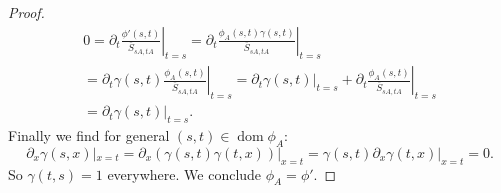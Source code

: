 \documentclass[b5paper,draft,openbib,12pt]{memoir}
\DeclareMathOperator{\dom}{dom}
\begin{document}
\begin{proof}
\begin{align}
0=\partial_t \left.\frac{\phi'(s,t)}{\overline{S}_{sA,tA}}\right|_{t=s}
=\partial_t \left.\frac{\phi_A(s,t) \gamma(s,t)}{\overline{S}_{sA,tA}}\right|_{t=s}\\
=\partial_t \left.\gamma(s,t) \frac{\phi_A(s,t)}{\overline{S}_{sA,tA}}\right|_{t=s}
=\partial_t \left.\gamma(s,t)\right|_{t=s} + \partial_t  \left.\frac{\phi_A(s,t)}{\overline{S}_{sA,tA}}\right|_{t=s}\\
=\partial_t \left.\gamma(s,t)\right|_{t=s}.
\end{align}
Finally we find for general \((s,t)\in \dom\phi_A\):
\begin{equation}
\partial_x \gamma(s,x)|_{x=t}=\partial_x ( \gamma(s,t) \gamma(t,x))|_{x=t}=\gamma(s,t) \partial_x \gamma(t,x)|_{x=t}=0.
\end{equation}
So \(\gamma(t,s)=1\) everywhere. We conclude \(\phi_A=\phi'\).

\end{proof}
\end{document}
